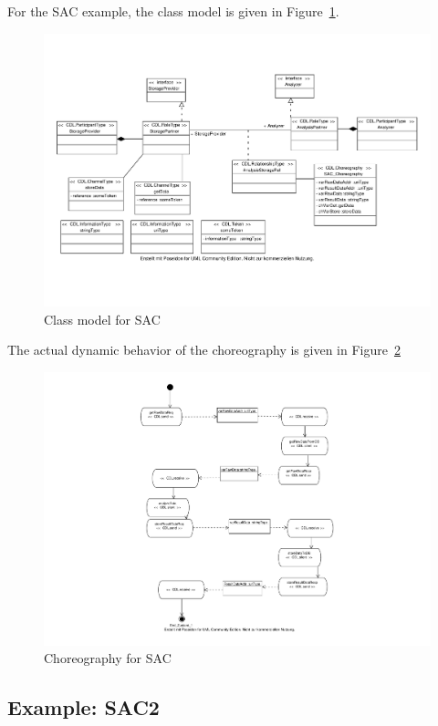 \documentclass[pdftex]{scrartcl}
\begin{document}
For the SAC example, the class model is given in
Figure~\ref{fig:SAC-class-model}. 

\begin{figure}
  \centering
  \includegraphics[scale=0.9,angle=90]{SAC_static_model.pdf}
  \caption{Class model for SAC}
  \label{fig:SAC-class-model}
\end{figure}

The actual dynamic behavior of the choreography is given in
Figure~\ref{fig:SAC-chor-model} 

\begin{figure}
  \centering
  \includegraphics[trim=200 0 0 0]{SAC_chor_model.pdf}
  \caption{Choreography for SAC}
  \label{fig:SAC-chor-model}
\end{figure}


\subsection{Example: SAC2}
\end{document}
